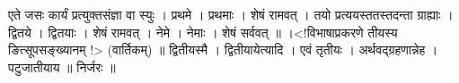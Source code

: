 एते जसः कार्यं प्रत्युक्तसंज्ञा वा स्युः । प्रथमे । प्रथमाः । शेषं
रामवत् । तयो प्रत्ययस्ततस्तदन्ता ग्राह्याः । द्वितये । द्वितयाः । शेषं
रामवत् । नेमे । नेमाः । शेषं सर्ववत् ॥ ।\textless{}!विभाषाप्रकरणे तीयस्य
ङित्सूपसङ्ख्यानम् !\textgreater{} (वार्तिकम्) ॥ द्वितीयस्मै ।
द्वितीयायेत्यादि । एवं तृतीयः । अर्थवद्ग्रहणान्नेह । पटुजातीयाय ॥
निर्जरः ॥
